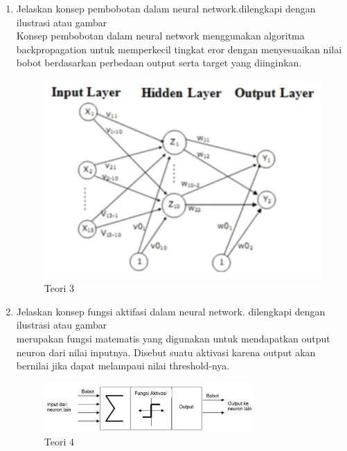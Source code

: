 \begin{enumerate}
\item Jelaskan konsep pembobotan dalam neural network.dilengkapi dengan ilustrasi atau gambar
	\hfill\\
	Konsep pembobotan dalam neural network menggunakan algoritma backpropagation untuk memperkecil tingkat eror dengan menyesuaikan nilai bobot berdasarkan perbedaan output serta target yang diinginkan.
\begin{figure}[H]
    \includegraphics[width=12cm]{figures/1174084/6/teori3.png}
    \centering
    \caption{Teori 3}
\end{figure}

\item Jelaskan konsep fungsi aktifasi dalam neural network. dilengkapi dengan ilustrasi atau gambar
\hfill\\
	merupakan fungsi matematis yang digunakan untuk mendapatkan output neuron dari nilai inputnya. Disebut suatu aktivasi karena output akan bernilai jika dapat melampaui nilai threshold-nya.
\begin{figure}[H]
    \includegraphics[width=8cm]{figures/1174084/6/teori4.png}
    \centering
    \caption{Teori 4}
\end{figure}


\end{enumerate}
